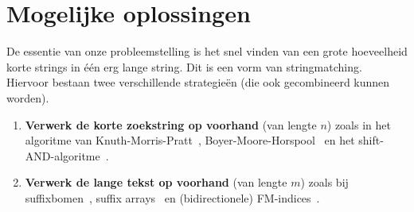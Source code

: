 \section{Mogelijke oplossingen}\label{sec:mogelijke-oplossingen}
De essentie van onze probleemstelling is het snel vinden van een grote hoeveelheid korte strings in één erg lange string.
Dit is een vorm van stringmatching.
Hiervoor bestaan twee verschillende strategieën (die ook gecombineerd kunnen worden).
\begin{enumerate}
    \item \textbf{Verwerk de korte zoekstring op voorhand} (van lengte $n$) zoals in het algoritme van Knuth-Morris-Pratt~\cite{knuth-morris-pratt}, Boyer-Moore-Horspool~\cite{boyer-moore-horspool} en het shift-AND-algoritme~\cite{shift-and}.
    \item \textbf{Verwerk de lange tekst op voorhand} (van lengte $m$) zoals bij suffixbomen~\cite{mcCreight_first_suffixtree}, suffix arrays~\cite{suffix_array_first_mention} en (bidirectionele) FM-indices~\cite{fm_index, bi-directional_fm_index}.
\end{enumerate}

